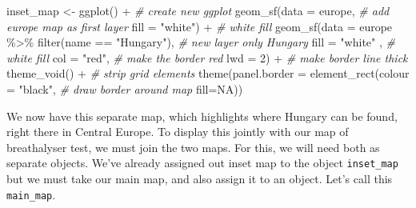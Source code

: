 \documentclass[
]{book}
\makeatletter
\newenvironment{Shaded}{\begin{snugshade}}{\end{snugshade}}
\newcommand{\AttributeTok}[1]{\textcolor[rgb]{0.61,0.61,0.61}{#1}}
\newcommand{\CommentTok}[1]{\textcolor[rgb]{0.37,0.37,0.37}{\textit{#1}}}
\newcommand{\ConstantTok}[1]{\textcolor[rgb]{0,0,0}{#1}}
\newcommand{\DecValTok}[1]{\textcolor[rgb]{0.06,0.06,0.06}{#1}}
\newcommand{\FunctionTok}[1]{\textcolor[rgb]{0,0,0}{#1}}
\newcommand{\NormalTok}[1]{#1}
\newcommand{\OtherTok}[1]{\textcolor[rgb]{0.37,0.37,0.37}{#1}}
\newcommand{\SpecialCharTok}[1]{\textcolor[rgb]{0,0,0}{#1}}
\newcommand{\StringTok}[1]{\textcolor[rgb]{0.5,0.5,0.5}{#1}}
\newenvironment{kframe}{%
\medskip{}
\setlength{\fboxsep}{.8em}
 \def\at@end@of@kframe{}%
 \ifinner\ifhmode%
  \def\at@end@of@kframe{\end{minipage}}%
  \begin{minipage}{\columnwidth}%
 \fi\fi%
 \def\FrameCommand##1{\hskip\@totalleftmargin \hskip-\fboxsep
 \colorbox{shadecolor}{##1}\hskip-\fboxsep
     \hskip-\linewidth \hskip-\@totalleftmargin \hskip\columnwidth}%
 \MakeFramed {\advance\hsize-\width
   \@totalleftmargin\z@ \linewidth\hsize
   \@setminipage}}%
 {\par\unskip\endMakeFramed%
 \at@end@of@kframe}
\renewenvironment{Shaded}{\begin{kframe}}{\end{kframe}}
\makeatother
\begin{document}
\begin{Shaded}
\begin{Highlighting}[]
\NormalTok{inset\_map }\OtherTok{\textless{}{-}} \FunctionTok{ggplot}\NormalTok{() }\SpecialCharTok{+}  \CommentTok{\# create new ggplot }
  \FunctionTok{geom\_sf}\NormalTok{(}\AttributeTok{data =}\NormalTok{ europe,  }\CommentTok{\# add europe map as first layer}
          \AttributeTok{fill =} \StringTok{"white"}\NormalTok{) }\SpecialCharTok{+} \CommentTok{\# white fill }
  \FunctionTok{geom\_sf}\NormalTok{(}\AttributeTok{data =}\NormalTok{ europe }\SpecialCharTok{\%\textgreater{}\%} \FunctionTok{filter}\NormalTok{(name }\SpecialCharTok{==} \StringTok{"Hungary"}\NormalTok{), }\CommentTok{\# new layer only Hungary}
          \AttributeTok{fill =} \StringTok{"white"}\NormalTok{ ,  }\CommentTok{\# white fill}
          \AttributeTok{col =} \StringTok{"red"}\NormalTok{,   }\CommentTok{\# make the border red}
          \AttributeTok{lwd =} \DecValTok{2}\NormalTok{) }\SpecialCharTok{+}   \CommentTok{\# make border line thick}
  \FunctionTok{theme\_void}\NormalTok{() }\SpecialCharTok{+}  \CommentTok{\# strip grid elements}
  \FunctionTok{theme}\NormalTok{(}\AttributeTok{panel.border =} \FunctionTok{element\_rect}\NormalTok{(}\AttributeTok{colour =} \StringTok{"black"}\NormalTok{, }\CommentTok{\# draw border around map}
                                    \AttributeTok{fill=}\ConstantTok{NA}\NormalTok{)) }
\end{Highlighting}
\end{Shaded}

We now have this separate map, which highlights where Hungary can be found, right there in Central Europe. To display this jointly with our map of breathalyser test, we must join the two maps. For this, we will need both as separate objects. We've already assigned out inset map to the object \texttt{inset\_map} but we must take our main map, and also assign it to an object. Let's call this \texttt{main\_map}.
\end{document}
